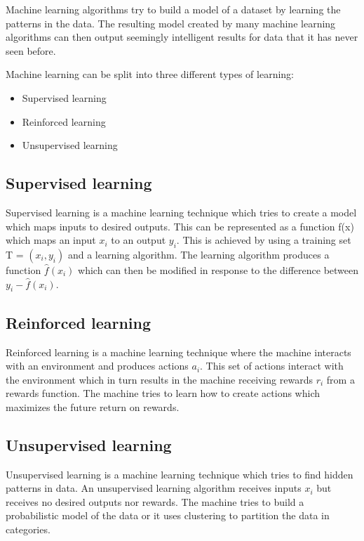 Machine learning algorithms try to build a model of a dataset by learning the patterns in the data.
The resulting model created by many machine learning algorithms can then output seemingly intelligent results for data that it has never seen before.

Machine learning can be split into three different types of learning:
\begin{itemize}
    \item Supervised learning
    \item Reinforced learning
    \item Unsupervised learning
\end{itemize}

\subsection{Supervised learning}
Supervised learning is a machine learning technique which tries to create a model which maps inputs to desired outputs.
This can be represented as a function f(x) which maps an input \(x_i\) to an output \(y_i\).
This is achieved by using a training set T = \((x_i, y_i)\) and a learning algorithm.
The learning algorithm produces a function \(\hat{f}(x_i)\) which can then be modified in response to the difference between \(y_i - \hat{f}(x_i)\)\cite{mlTutorial}.

\subsection{Reinforced learning}
Reinforced learning is a machine learning technique where the machine interacts with an environment and produces actions \(a_i\).
This set of actions interact with the environment which in turn results in the machine receiving rewards \(r_i\) from a rewards function.
The machine tries to learn how to create actions which maximizes the future return on rewards\cite{mlTutorial}.

\subsection{Unsupervised learning}
Unsupervised learning is a machine learning technique which tries to find hidden patterns in data.
An unsupervised learning algorithm receives inputs \(x_i\) but receives no desired outputs nor rewards.
The machine tries to build a probabilistic model of the data or it uses clustering to partition the data in categories\cite{mlTutorial}.

